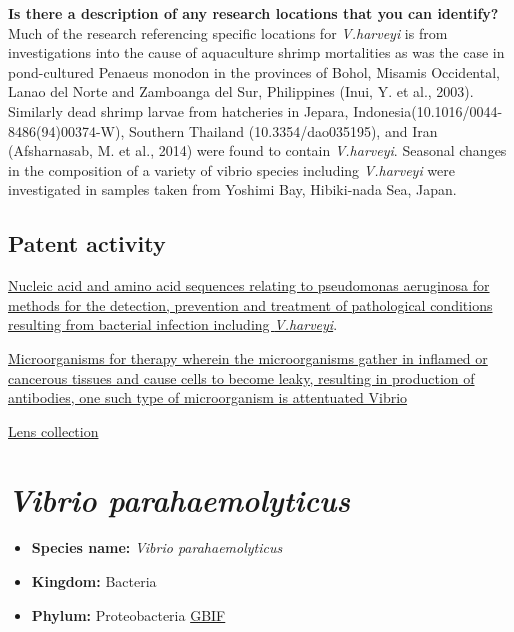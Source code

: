 \documentclass[]{book}
\providecommand{\tightlist}{%
  \setlength{\itemsep}{0pt}\setlength{\parskip}{0pt}}
\theoremstyle{definition}
\theoremstyle{definition}
\theoremstyle{definition}
\theoremstyle{remark}
\begin{document}
\textbf{Is there a description of any research locations that you can
identify?}\\
Much of the research referencing specific locations for \emph{V.harveyi}
is from investigations into the cause of aquaculture shrimp mortalities
as was the case in pond-cultured Penaeus monodon in the provinces of
Bohol, Misamis Occidental, Lanao del Norte and Zamboanga del Sur,
Philippines (Inui, Y. et al., 2003). Similarly dead shrimp larvae from
hatcheries in Jepara, Indonesia(10.1016/0044-8486(94)00374-W), Southern
Thailand (10.3354/dao035195), and Iran (Afsharnasab, M. et al., 2014)
were found to contain \emph{V.harveyi}. Seasonal changes in the
composition of a variety of vibrio species including \emph{V.harveyi}
were investigated in samples taken from Yoshimi Bay, Hibiki-nada Sea,
Japan.

\hypertarget{patent-activity-8}{%
\subsection{Patent activity}\label{patent-activity-8}}

\href{https://www.lens.org/lens/patent/US_6551795_B1}{Nucleic acid and
amino acid sequences relating to pseudomonas aeruginosa for methods for
the detection, prevention and treatment of pathological conditions
resulting from bacterial infection including \emph{V.harveyi}}.

\href{https://www.lens.org/lens/patent/US_2007_0212727_A1}{Microorganisms
for therapy wherein the microorganisms gather in inflamed or cancerous
tissues and cause cells to become leaky, resulting in production of
antibodies, one such type of microorganism is attentuated Vibrio}

\href{https://www.lens.org/lens/collection/24872}{Lens collection}

\hypertarget{vibrio-parahaemolyticus}{%
\section{\texorpdfstring{\emph{Vibrio
parahaemolyticus}}{Vibrio parahaemolyticus}}\label{vibrio-parahaemolyticus}}

\begin{itemize}
\tightlist
\item
  \textbf{Species name:} \emph{Vibrio parahaemolyticus}
\item
  \textbf{Kingdom:} Bacteria\\
\item
  \textbf{Phylum:} Proteobacteria
  \href{https://www.gbif.org/species/5427673}{GBIF}
\end{itemize}
\end{document}
